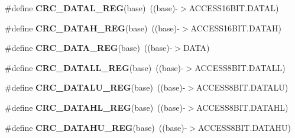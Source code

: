 \begin{DoxyCompactItemize}
\item 
\#define {\bfseries C\+R\+C\+\_\+\+D\+A\+T\+A\+L\+\_\+\+R\+EG}(base)~((base)-\/$>$A\+C\+C\+E\+S\+S16\+B\+I\+T.\+D\+A\+T\+AL)\hypertarget{group__CRC__Register__Accessor__Macros_ga54f4e08c650fbcfdda8439fcff3cc0d0}{}\label{group__CRC__Register__Accessor__Macros_ga54f4e08c650fbcfdda8439fcff3cc0d0}

\item 
\#define {\bfseries C\+R\+C\+\_\+\+D\+A\+T\+A\+H\+\_\+\+R\+EG}(base)~((base)-\/$>$A\+C\+C\+E\+S\+S16\+B\+I\+T.\+D\+A\+T\+AH)\hypertarget{group__CRC__Register__Accessor__Macros_ga890c16e0618372d6a3a9b1aa97eff39c}{}\label{group__CRC__Register__Accessor__Macros_ga890c16e0618372d6a3a9b1aa97eff39c}

\item 
\#define {\bfseries C\+R\+C\+\_\+\+D\+A\+T\+A\+\_\+\+R\+EG}(base)~((base)-\/$>$D\+A\+TA)\hypertarget{group__CRC__Register__Accessor__Macros_ga17e6745c67535b0f48a64c0331f44e86}{}\label{group__CRC__Register__Accessor__Macros_ga17e6745c67535b0f48a64c0331f44e86}

\item 
\#define {\bfseries C\+R\+C\+\_\+\+D\+A\+T\+A\+L\+L\+\_\+\+R\+EG}(base)~((base)-\/$>$A\+C\+C\+E\+S\+S8\+B\+I\+T.\+D\+A\+T\+A\+LL)\hypertarget{group__CRC__Register__Accessor__Macros_ga2e802356d547513cc167cbfc74360a88}{}\label{group__CRC__Register__Accessor__Macros_ga2e802356d547513cc167cbfc74360a88}

\item 
\#define {\bfseries C\+R\+C\+\_\+\+D\+A\+T\+A\+L\+U\+\_\+\+R\+EG}(base)~((base)-\/$>$A\+C\+C\+E\+S\+S8\+B\+I\+T.\+D\+A\+T\+A\+LU)\hypertarget{group__CRC__Register__Accessor__Macros_ga7d345ba407c8f141876983d3d682e60e}{}\label{group__CRC__Register__Accessor__Macros_ga7d345ba407c8f141876983d3d682e60e}

\item 
\#define {\bfseries C\+R\+C\+\_\+\+D\+A\+T\+A\+H\+L\+\_\+\+R\+EG}(base)~((base)-\/$>$A\+C\+C\+E\+S\+S8\+B\+I\+T.\+D\+A\+T\+A\+HL)\hypertarget{group__CRC__Register__Accessor__Macros_ga4e248bcf436029f7e5d8e51be0d09197}{}\label{group__CRC__Register__Accessor__Macros_ga4e248bcf436029f7e5d8e51be0d09197}

\item 
\#define {\bfseries C\+R\+C\+\_\+\+D\+A\+T\+A\+H\+U\+\_\+\+R\+EG}(base)~((base)-\/$>$A\+C\+C\+E\+S\+S8\+B\+I\+T.\+D\+A\+T\+A\+HU)\hypertarget{group__CRC__Register__Accessor__Macros_ga0ff43e8e832829a862d36a8f33f08126}{}\label{group__CRC__Register__Accessor__Macros_ga0ff43e8e832829a862d36a8f33f08126}


\end{DoxyCompactItemize}

